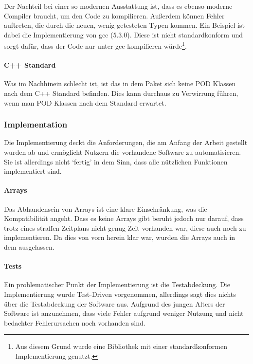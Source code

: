       Der Nachteil bei einer so modernen Ausstattung ist, dass es ebenso moderne Compiler braucht, um den Code zu kompilieren. Außerdem können Fehler auftreten, die durch die neuen, wenig getesteten Typen kommen. Ein Beispiel ist dabei die  Implementierung von gcc ($5.3.0$). Diese ist nicht standardkonform und sorgt dafür, dass der Code nur unter gcc kompilieren würde\footnote{
        Aus diesem Grund wurde eine Bibliothek mit einer standardkonformen Implementierung genutzt.
      }.

    \paragraph{C++ Standard}
      Was im Nachhinein schlecht ist, ist das in dem  Paket sich keine POD Klassen nach dem C++ Standard befinden. Dies kann durchaus zu Verwirrung führen, wenn man POD Klassen nach dem Standard erwartet.

  \subsubsection{Implementation}
  \label{sssec:Implementation}
    Die Implementierung deckt die Anforderungen, die am Anfang der Arbeit gestellt wurden ab und ermöglicht Nutzern die vorhandene Software zu automatisieren. Sie ist allerdings nicht `fertig' in dem Sinn, dass alle nützlichen Funktionen implementiert sind.

    \paragraph{Arrays}
    Das Abhandensein von Arrays ist eine klare Einschränkung, was die Kompatibilität angeht. Dass es keine Arrays gibt beruht jedoch nur darauf, dass trotz eines straffen Zeitplans nicht genug Zeit vorhanden war, diese auch noch zu implementieren. Da dies von vorn herein klar war, wurden die Arrays auch in dem  ausgelassen.

    \paragraph{Tests}
    Ein problematischer Punkt der Implementierung ist die Testabdeckung. Die Implementierung wurde Test-Driven vorgenommen, allerdings sagt dies nichts über die Testabdeckung der Software aus. Aufgrund des jungen Alters der Software ist anzunehmen, dass viele Fehler aufgrund weniger Nutzung und nicht bedachter Fehlerursachen noch vorhanden sind.

